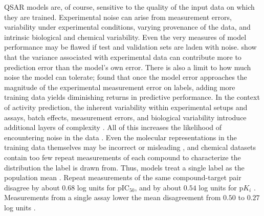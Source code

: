 QSAR models are, of course, sensitive to the quality of the input data on which they are trained. Experimental noise can arise from measurement errors, variability under experimental conditions, varying provenance of the data, and intrinsic biological and chemical variability. Even the very measures of model performance may be flawed if test and validation sets are laden with noise. \citet{Kolmar2021} show that the variance associated with experimental data can contribute more to prediction error than the model’s own error. There is also a limit to how much noise the model can tolerate; \citet{jorner2021} found that once the model error approaches the magnitude of the experimental measurement error on labels, adding more training data yields diminishing returns in predictive performance. In the context of activity prediction, the inherent variability within experimental setups and assays, batch effects, measurement errors, and biological variability introduce additional layers of complexity \citep{Kolmar2021, Fourches2010}. All of this increases the likelihood of encountering noise in the data \citep{Fang2022}. Even the molecular representations in the training data themselves may be incorrect or misleading \citep{Walters2023}, and chemical datasets contain too few repeat measurements of each compound to characterize the distribution the label is drawn from. Thus, models treat a single label as the population mean \citep{Kolmar2021}. Repeat measurements of the same compound-target pair disagree by about $0.68$ log units for pIC$_{50}$, and by about $0.54$ log units for p$K_i$ \citep{Kalliokoski2013, Kramer2012}. Measurements from a single assay lower the mean disagreement from $0.50$ to $0.27$ log units \citep{landrum2024}.


